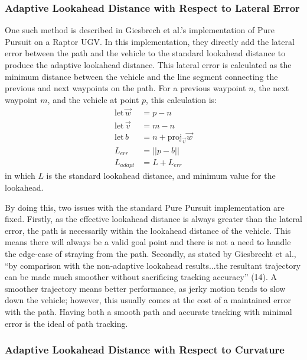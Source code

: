 \documentclass[mla7]{mla}
\begin{document}
\begin{paper}
\subsubsection{Adaptive Lookahead Distance with Respect to Lateral Error}

One such method is described in Giesbrech et al.'s implementation of Pure Pursuit on a Raptor UGV. In this implementation, they directly add the lateral error between the path and the vehicle to the standard lookahead distance to produce the adaptive lookahead distance. This lateral error is calculated as the minimum distance between the vehicle and the line segment connecting the previous and next waypoints on the path. For a previous waypoint $n$, the next waypoint $m$, and the vehicle at point $p$, this calculation is:
\begin{subequations}
\begin{align}
\text{let}\,\vec{w} &= p - n \\
\text{let}\,\vec{v} &= m - n \\
\text{let}\, b &= n + \text{proj}_{\vec{v}}\vec{w} \label{eqn:nearestPoint}\\
L_{err} &= ||p-b|| \\
L_{adapt} &= L + L_{err}
\end{align}
\end{subequations}
in which $L$ is the standard lookahead distance, and minimum value for the lookahead.

By doing this, two issues with the standard Pure Pursuit implementation are fixed. Firstly, as the effective lookahead distance is always greater than the lateral error, the path is necessarily within the lookahead distance of the vehicle. This means there will always be a valid goal point and there is not a need to handle the edge-case of straying from the path. Secondly, as stated by Giesbrecht et al., ``by comparison with the non-adaptive lookahead results...the resultant trajectory can be made much smoother without sacrificing tracking accuracy'' (14). A smoother trajectory means better performance, as jerky motion tends to slow down the vehicle; however, this usually comes at the cost of a maintained error with the path. Having both a smooth path and accurate tracking with minimal error is the ideal of path tracking.

\subsubsection{Adaptive Lookahead Distance with Respect to Curvature}


\end{paper}
\end{document}
